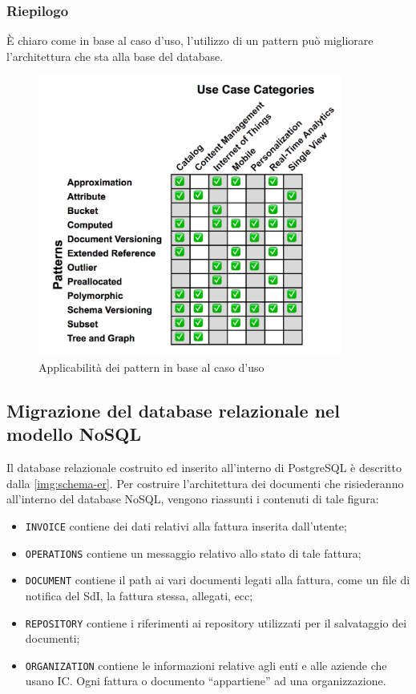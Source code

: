 \subsubsection{Riepilogo}
È chiaro come in base al caso d'uso, l'utilizzo di un pattern può migliorare l'architettura che sta alla base del database.

\begin{figure}[htbp]
\begin{center}
\includegraphics[height=25em]{immagini/patterns-table.png}
\caption{Applicabilità dei pattern in base al caso d'uso}
\end{center}
\end{figure}

\subsection{Migrazione del database relazionale nel modello NoSQL}
Il database relazionale costruito ed inserito all'interno di PostgreSQL è descritto dalla \autoref{img:schema-er}. Per costruire l'architettura dei documenti che risiederanno all'interno del database NoSQL, vengono riassunti i contenuti di tale figura:\\
\begin{itemize}
    \item \texttt{INVOICE} contiene dei dati relativi alla fattura inserita dall'utente;
    \item \texttt{OPERATIONS} contiene un messaggio relativo allo stato di tale fattura;
    \item \texttt{DOCUMENT} contiene il path ai vari documenti legati alla fattura, come un file di notifica del SdI, la fattura stessa, allegati, ecc;
    \item \texttt{REPOSITORY} contiene i riferimenti ai repository utilizzati per il salvataggio dei documenti;
    \item \texttt{ORGANIZATION} contiene le informazioni relative agli enti e alle aziende che usano IC. Ogni fattura o documento ``appartiene'' ad una organizzazione.
\end{itemize}

